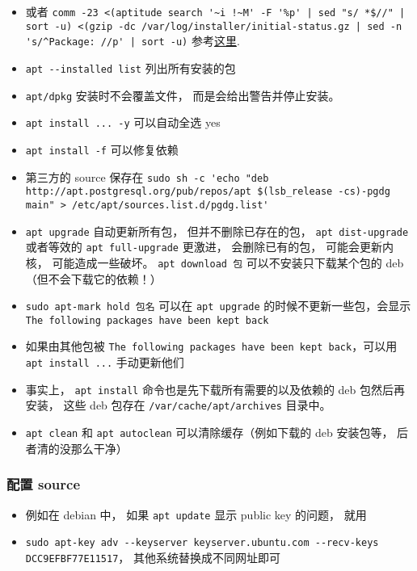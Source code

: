 \begin{itemize}
\item 或者 \verb`comm -23 <(aptitude search '~i !~M' -F '%p' | sed "s/ *$//" | sort -u) <(gzip -dc /var/log/installer/initial-status.gz | sed -n 's/^Package: //p' | sort -u)` 参考\href{https://askubuntu.com/questions/2389/how-to-list-manually-installed-packages}{这里}.
\item \verb`apt --installed list` 列出所有安装的包
\item \verb`apt/dpkg` 安装时不会覆盖文件， 而是会给出警告并停止安装。
\item \verb`apt install ... -y` 可以自动全选 yes
\item \verb`apt install -f` 可以修复依赖
\item 第三方的 source 保存在 \verb`sudo sh -c 'echo "deb http://apt.postgresql.org/pub/repos/apt $(lsb_release -cs)-pgdg main" > /etc/apt/sources.list.d/pgdg.list'`
\item \verb`apt upgrade` 自动更新所有包， 但并不删除已存在的包， \verb`apt dist-upgrade` 或者等效的 \verb`apt full-upgrade` 更激进， 会删除已有的包， 可能会更新内核， 可能造成一些破坏。
\verb`apt download 包` 可以不安装只下载某个包的 deb （但不会下载它的依赖！）
\item \verb`sudo apt-mark hold 包名` 可以在 \verb`apt upgrade` 的时候不更新一些包，会显示 \verb`The following packages have been kept back`
\item 如果由其他包被 \verb`The following packages have been kept back`，可以用 \verb`apt install ...` 手动更新他们
\item 事实上， \verb`apt install` 命令也是先下载所有需要的以及依赖的 deb 包然后再安装， 这些 deb 包存在 \verb`/var/cache/apt/archives` 目录中。
\item \verb`apt clean` 和 \verb`apt autoclean` 可以清除缓存（例如下载的 deb 安装包等， 后者清的没那么干净）
\end{itemize}


\subsubsection{配置 source}
\begin{itemize}
\item 例如在 debian 中， 如果 \verb`apt update` 显示 public key 的问题， 就用
\item \verb`sudo apt-key adv --keyserver keyserver.ubuntu.com --recv-keys DCC9EFBF77E11517`， 其他系统替换成不同网址即可
\end{itemize}

